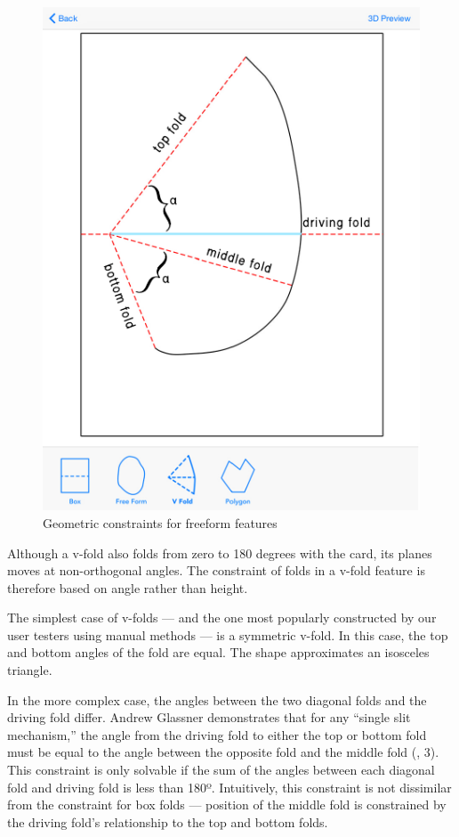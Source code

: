 \begin{figure}[htbp]
\centering
\includegraphics{figures/45_Tech_Constraints/vfoldConstraints.pdf}
\caption{Geometric constraints for freeform features}
\end{figure}

Although a v-fold also folds from zero to 180 degrees with the card, its
planes moves at non-orthogonal angles. The constraint of folds in a
v-fold feature is therefore based on angle rather than height.

The simplest case of v-folds --- and the one most popularly constructed
by our user testers using manual methods --- is a symmetric v-fold. In
this case, the top and bottom angles of the fold are equal. The shape
approximates an isosceles triangle.

In the more complex case, the angles between the two diagonal folds and
the driving fold differ. Andrew Glassner demonstrates that for any
``single slit mechanism,'' the angle from the driving fold to either the
top or bottom fold must be equal to the angle between the opposite fold
and the middle fold (\citet{glassner1998interactive}, 3). This
constraint is only solvable if the sum of the angles between each
diagonal fold and driving fold is less than 180º. Intuitively, this
constraint is not dissimilar from the constraint for box folds ---
position of the middle fold is constrained by the driving fold's
relationship to the top and bottom folds.

